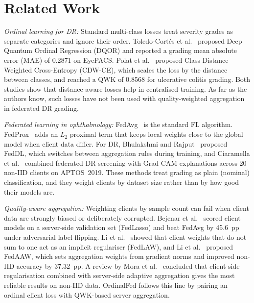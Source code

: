 \section{Related Work}
\label{sec:related}

\textit{Ordinal learning for DR:}
Standard multi-class losses treat severity grades as separate categories and ignore
their order. Toledo-Cort\'{e}s et al.~\cite{toledocortes2022dqor} proposed Deep
Quantum Ordinal Regression (DQOR) and reported a grading mean absolute error (MAE)
of 0.2871 on EyePACS. Polat et al.~\cite{polat2024cdwce} proposed Class Distance
Weighted Cross-Entropy (CDW-CE), which scales the loss by the distance between
classes, and reached a QWK of 0.8568 for ulcerative colitis grading. Both studies
show that distance-aware losses help in centralised training. As far as the
authors know, such losses have not been used with quality-weighted
aggregation in federated DR grading.

\textit{Federated learning in ophthalmology:}
FedAvg~\cite{mcmahan2017fedavg} is the standard FL algorithm.
FedProx~\cite{li2020fedprox} adds an $L_2$ proximal term that keeps local weights
close to the global model when client data differ. For DR, Bhulakshmi and
Rajput~\cite{bhulakshmi2024feddl} proposed FedDL, which switches between
aggregation rules during training, and Ciaramella et al.~\cite{ciaramella2025fl}
combined federated DR screening with Grad-CAM explanations across 20 non-IID
clients on APTOS~2019. These methods treat grading as plain (nominal)
classification, and they weight clients by dataset size rather than by how good
their models are.

\textit{Quality-aware aggregation:}
Weighting clients by sample count can fail when client data are strongly biased or
deliberately corrupted. Bejenar et al.~\cite{bejenar2023aggregation} scored client
models on a server-side validation set (FedLasso) and beat FedAvg by 45.6~pp under
adversarial label flipping. Li et al.~\cite{li2023revisiting} showed that client
weights that do not sum to one act as an implicit regulariser (FedLAW), and Li et
al.~\cite{li2025fedaaw} proposed FedAAW, which sets aggregation weights from
gradient norms and improved non-IID accuracy by 37.32~pp. A review by Mora et
al.~\cite{mora2024review} concluded that client-side regularisation combined with
server-side adaptive aggregation gives the most reliable results on non-IID data.
OrdinalFed follows this line by pairing an ordinal client loss with QWK-based
server aggregation.

